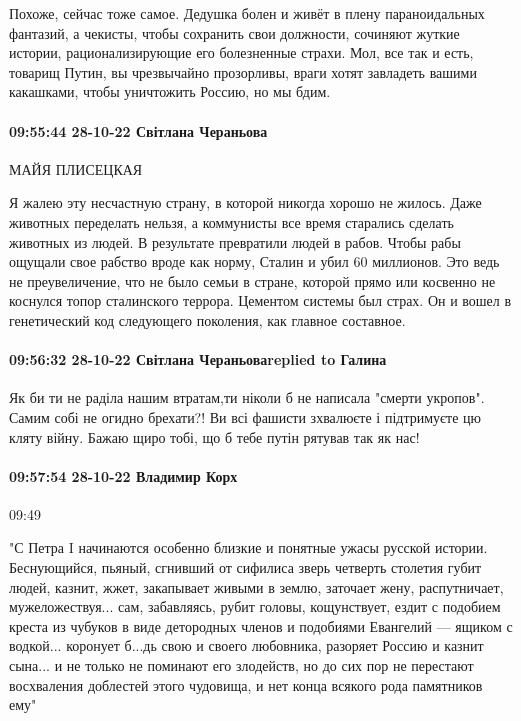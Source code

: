 Похоже, сейчас тоже самое. Дедушка болен и живёт в плену параноидальных
фантазий, а чекисты, чтобы сохранить свои должности, сочиняют жуткие истории,
рационализирующие его болезненные страхи. Мол, все так и есть, товарищ Путин,
вы чрезвычайно прозорливы, враги хотят завладеть вашими какашками, чтобы
уничтожить Россию, но мы бдим.

\paragraph{09:55:44 28-10-22 Світлана Чераньова}
МАЙЯ ПЛИСЕЦКАЯ

Я жалею эту несчастную страну, в которой никогда хорошо не жилось. Даже
животных переделать нельзя, а коммунисты все время старались сделать животных
из людей. В результате превратили людей в рабов. Чтобы рабы ощущали свое
рабство вроде как норму, Сталин и убил 60 миллионов. Это ведь не преувеличение,
что не было семьи в стране, которой прямо или косвенно не коснулся топор
сталинского террора. Цементом системы был страх. Он и вошел в генетический код
следующего поколения, как главное составное.

\paragraph{09:56:32 28-10-22 Світлана Чераньоваreplied to Галина}

Як би ти не раділа нашим втратам,ти ніколи б не написала "смерти укропов".
Самим собі не огидно брехати?! Ви всі фашисти зхвалюєте і підтримуєте цю кляту
війну. Бажаю щиро тобі, що б тебе путін рятував так як нас!

\paragraph{09:57:54 28-10-22 Владимир Корх}

09:49

"С Петра I начинаются особенно близкие и понятные ужасы русской истории.
Беснующийся, пьяный, сгнивший от сифилиса зверь четверть столетия губит людей,
казнит, жжет, закапывает живыми в землю, заточает жену, распутничает,
мужеложествуя... сам, забавляясь, рубит головы, кощунствует, ездит с подобием
креста из чубуков в виде детородных членов и подобиями Евангелий — ящиком с
водкой... коронует б...дь свою и своего любовника, разоряет Россию и казнит
сына... и не только не поминают его злодейств, но до сих пор не перестают
восхваления доблестей этого чудовища, и нет конца всякого рода памятников ему"

